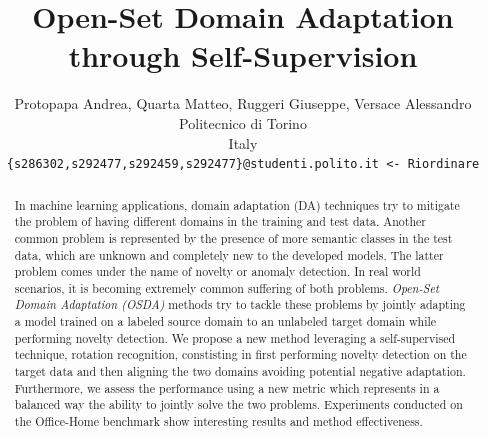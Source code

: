 \documentclass[10pt,twocolumn,letterpaper]{article}
\begin{document}
\title{Open-Set Domain Adaptation through Self-Supervision}

\author{Protopapa Andrea, Quarta Matteo, Ruggeri Giuseppe, Versace Alessandro\\
Politecnico di Torino\\
Italy\\
{\tt\small \{s286302,s292477,s292459,s292477\}@studenti.polito.it <- Riordinare}
}
\maketitle

\begin{abstract}
  In machine learning applications, domain adaptation (DA) techniques try to mitigate the problem of having different domains in the training and test data.
  Another common problem is represented by the presence of more semantic classes in the test data, which are unknown
  and completely new to the developed models. The latter problem comes under the name of novelty or anomaly detection.
  In real world scenarios, it is becoming extremely common suffering of both problems.
  \textit{Open-Set Domain Adaptation (OSDA)} methods try to tackle these problems by jointly adapting a model trained on a labeled source domain to an unlabeled target domain
  while performing novelty detection. We propose a new method leveraging a self-supervised technique, rotation recognition, constisting in first performing
  novelty detection on the target data and then aligning the two domains avoiding potential negative adaptation.
  Furthermore, we assess the performance using a new metric which represents in a balanced way the ability to jointly solve the two problems.
  Experiments conducted on the Office-Home benchmark show interesting results and method effectiveness.
   

\end{abstract}
\end{document}
